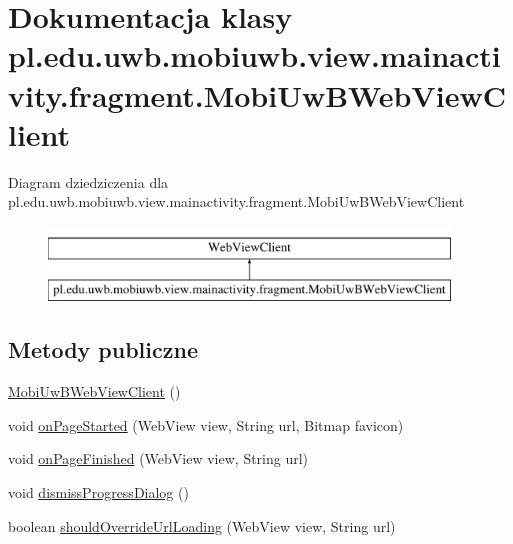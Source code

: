 \hypertarget{classpl_1_1edu_1_1uwb_1_1mobiuwb_1_1view_1_1mainactivity_1_1fragment_1_1_mobi_uw_b_web_view_client}{}\section{Dokumentacja klasy pl.\+edu.\+uwb.\+mobiuwb.\+view.\+mainactivity.\+fragment.\+Mobi\+Uw\+B\+Web\+View\+Client}
\label{classpl_1_1edu_1_1uwb_1_1mobiuwb_1_1view_1_1mainactivity_1_1fragment_1_1_mobi_uw_b_web_view_client}
Diagram dziedziczenia dla pl.\+edu.\+uwb.\+mobiuwb.\+view.\+mainactivity.\+fragment.\+Mobi\+Uw\+B\+Web\+View\+Client\begin{figure}[H]
\begin{center}
\leavevmode
\includegraphics[height=2.000000cm]{classpl_1_1edu_1_1uwb_1_1mobiuwb_1_1view_1_1mainactivity_1_1fragment_1_1_mobi_uw_b_web_view_client}
\end{center}
\end{figure}
\subsection*{Metody publiczne}
\begin{DoxyCompactItemize}
\item 
\hyperlink{classpl_1_1edu_1_1uwb_1_1mobiuwb_1_1view_1_1mainactivity_1_1fragment_1_1_mobi_uw_b_web_view_client_ac55f07caf7bb2f40df9ce7bbd5861836}{Mobi\+Uw\+B\+Web\+View\+Client} ()
\item 
void \hyperlink{classpl_1_1edu_1_1uwb_1_1mobiuwb_1_1view_1_1mainactivity_1_1fragment_1_1_mobi_uw_b_web_view_client_a5bbe7bba6aa73ee658116889ca9bc673}{on\+Page\+Started} (Web\+View view, String url, Bitmap favicon)
\item 
void \hyperlink{classpl_1_1edu_1_1uwb_1_1mobiuwb_1_1view_1_1mainactivity_1_1fragment_1_1_mobi_uw_b_web_view_client_ab358ff9052e45d7f32c6f7b677c4d4fb}{on\+Page\+Finished} (Web\+View view, String url)
\item 
void \hyperlink{classpl_1_1edu_1_1uwb_1_1mobiuwb_1_1view_1_1mainactivity_1_1fragment_1_1_mobi_uw_b_web_view_client_af29547b4bfc6fd59d87f43a3207d1d44}{dismiss\+Progress\+Dialog} ()
\item 
boolean \hyperlink{classpl_1_1edu_1_1uwb_1_1mobiuwb_1_1view_1_1mainactivity_1_1fragment_1_1_mobi_uw_b_web_view_client_a5e386d9a74cd6409c9e641c11ca2d934}{should\+Override\+Url\+Loading} (Web\+View view, String url)
\end{DoxyCompactItemize}


